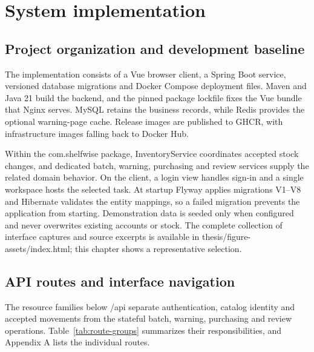 \chapter{System implementation}

\FloatBarrier

\section{Project organization and development baseline}

The implementation consists of a Vue browser client, a Spring Boot service, versioned database migrations and Docker Compose deployment files. Maven and Java 21 build the backend, and the pinned package lockfile fixes the Vue bundle that Nginx serves. MySQL retains the business records, while Redis provides the optional warning-page cache. Release images are published to GHCR, with infrastructure images falling back to Docker Hub.


Within the com.shelfwise package, InventoryService coordinates accepted stock changes, and dedicated batch, warning, purchasing and review services supply the related domain behavior. On the client, a login view handles sign-in and a single workspace hosts the selected task. At startup Flyway applies migrations V1–V8 and Hibernate validates the entity mappings, so a failed migration prevents the application from starting. Demonstration data is seeded only when configured and never overwrites existing accounts or stock. The complete collection of interface captures and source excerpts is available in thesis/figure-assets/index.html; this chapter shows a representative selection.


\FloatBarrier

\section{API routes and interface navigation}

The resource families below /api separate authentication, catalog identity and accepted movements from the stateful batch, warning, purchasing and review operations. Table~\ref{tab:route-groups} summarizes their responsibilities, and Appendix A lists the individual routes.


